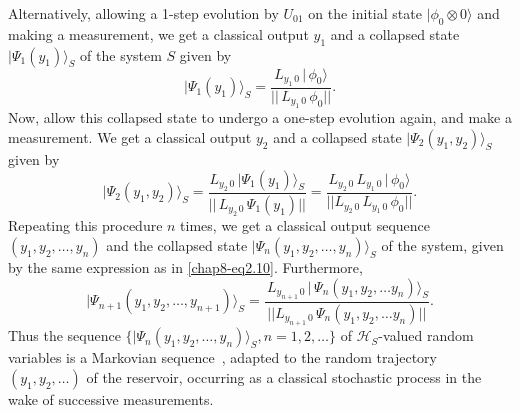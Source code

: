 Alternatively, allowing a 1-step evolution by $U_{01}$ on the initial state $\vert \phi_0\otimes 0\rangle$ and making a measurement, we  get a classical output $y_1$ and a collapsed state $\vert\Psi_1(y_1)\rangle_S$ of the system $S$ given by 
\begin{equation} 
\vert\Psi_1(y_1)\rangle_S=\frac{L_{y_1\,0}\, \vert\, \phi_0\rangle}{\vert\vert\, L_{y_1\,0}\, \phi_0\vert\vert}. \label{chap8-eq2.11}
\end{equation}
Now, allow this collapsed state to undergo a one-step evolution again, and make a measurement. We get a classical output $y_2$ and a collapsed state $\vert\Psi_2(y_1,y_2)\rangle_S$ given by  
\begin{equation}
\vert\Psi_2(y_1,y_2)\rangle_S= \frac{L_{y_2\,0}\, \vert\Psi_1(y_1)\rangle_S }{\vert\vert\, L_{y_2\,0}\,\Psi_1(y_1)\vert\vert}
=\frac{ L_{y_2\,0}\,L_{y_1\,0}\, \vert\,\phi_0\rangle}{\vert\vert L_{y_2\,0}\,L_{y_1\,0}\, \phi_0\vert\vert}.\label{chap8-eq2.12}
\end{equation} 
Repeating this procedure $n$ times, we get a classical output sequence $(y_1,y_2,\ldots , y_n)$ and the collapsed state 
$\vert\Psi_n(y_1, y_2,\ldots, y_{n})\rangle_S$ of the system, given by the same expression as in \eqref{chap8-eq2.10}. Furthermore, 
\begin{equation}
\vert\Psi_{n+1}(y_1, y_2,\ldots ,y_{n+1})\rangle_S=\frac{ \, L_{y_{n+1}\, 0}\, \vert\, \Psi_n(y_1,y_2,\ldots y_n)\rangle_S}
{\vert\vert L_{y_{n+1}\, 0}\, \Psi_n(y_1,y_2,\ldots y_n)\vert\vert}. \label{chap8-eq2.13}
\end{equation} 
Thus the sequence $\{\vert\Psi_n(y_1, y_2,\ldots ,y_{n})\rangle_S, n=1,2,\ldots\}$ of $\mathcal{H}_S$-valued random variables is a Markovian sequence~\cite{chap8-key9, chap8-key29,chap8-key30,chap8-key31, chap8-key36}, adapted to the random trajectory $(y_1,y_2,\ldots)$ of the reservoir, occurring as a classical stochastic process in the wake of successive measurements.

